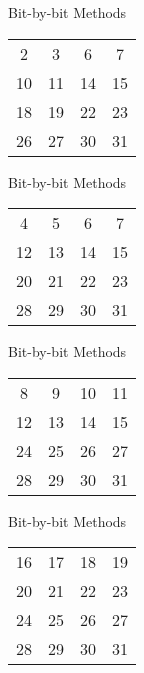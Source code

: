 \documentclass[serif,xcolor=pdftex,dvipsnames,table,hyperref={bookmarks=false,breaklinks}]{beamer}
\begin{document}
\begin{frame}[t]{Bit-by-bit Methods}
	\Huge
	\vspace{1cm}
	\centering
	\begin{tabular}{c c c c}
		2 & 3 & 6 & 7\\
		10 & 11 & 14 & 15\\
		18 & 19 & 22 & 23\\
		26 & 27 & 30 & 31\\
	\end{tabular}
\end{frame}

\begin{frame}[t]{Bit-by-bit Methods}
	\Huge
	\vspace{1cm}
	\centering
	\begin{tabular}{c c c c}
		4 & 5 & 6 & 7\\
		12 & 13 & 14 & 15\\
		20 & 21 & 22 & 23\\
		28 & 29 & 30 & 31\\
	\end{tabular}
\end{frame}

\begin{frame}[t]{Bit-by-bit Methods}
	\Huge
	\vspace{1cm}
	\centering
	\begin{tabular}{c c c c}
		8 & 9 & 10 & 11\\
		12 & 13 & 14 & 15\\
		24 & 25 & 26 & 27\\
		28 & 29 & 30 & 31\\
	\end{tabular}
\end{frame}

\begin{frame}[t]{Bit-by-bit Methods}
	\Huge
	\vspace{1cm}
	\centering
	\begin{tabular}{c c c c}
		16 & 17 & 18 & 19\\
		20 & 21 & 22 & 23\\
		24 & 25 & 26 & 27\\
		28 & 29 & 30 & 31\\
	\end{tabular}
\end{frame}
\end{document}
